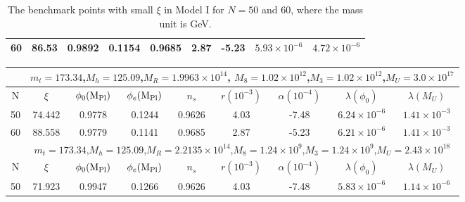 \documentclass[aps,prd,preprint,superscriptaddress,showpacs,ctexart]{revtex4-1}
\providecommand{\tabularnewline}{\\}
\begin{document}
\begin{table}[H]
\begin{tabular}{|c|c|c|c|c|c|c|c|c|}
		\hline
		{\footnotesize{}{}{}60}  & {\footnotesize{}{}{}86.53}  & {\footnotesize{}{}{}0.9892}  & {\footnotesize{}{}{}0.1154}  & {\footnotesize{}{}{}0.9685}  & {\footnotesize{}{}{}2.87}  & {\footnotesize{}{}{}-5.23}  & {\footnotesize{}{}{}$5.93\times10^{-6}$}  & {\footnotesize{}{}{}$4.72\times10^{-6}$ }\tabularnewline
		\hline
	\end{tabular}
	\caption{The benchmark points with small $\xi$ in Model I for $N=50$ and
		60, where the mass unit is  GeV.}
	\label{tab:small_xi_case1} 
\end{table}



\begin{table}[H]
{\raggedright{}}%
\begin{tabular}{|c|c|c|c|c|c|c|c|c|}
\hline
 & \multicolumn{8}{c|}{{\footnotesize{}{}{}$m_{t}=173.34$,$M_{h}=125.09$,$M_{R}=1.9963\times10^{14}$,
$M_{8}=1.02\times10^{12}$,$M_{3}=1.02\times10^{12}$,$M_{U}=3.0\times10^{17}$}}\tabularnewline
\hline
{\footnotesize{}{}{}N}  & {\footnotesize{}{}{}$\xi$ }  & {\footnotesize{}{}{}$\phi_{0}({\rm M_{Pl})}$}  & {\footnotesize{}{}{}$\phi_{e}({\rm M_{Pl})}$}  & {\footnotesize{}{}{}$n_{s}$}  & {\footnotesize{}{}{}$r(10^{-3})$}  & {\footnotesize{}{}{}$\alpha(10^{-4})$}  & {\footnotesize{}{}{}$\lambda(\phi_{0})$}  & {\footnotesize{}{}{}$\lambda(M_{U})$}\tabularnewline
\hline
{\footnotesize{}{}{}50}  & {\footnotesize{}{}{}74.442}  & {\footnotesize{}{}{}0.9778}  & {\footnotesize{}{}{}0.1244}  & {\footnotesize{}{}{}0.9626}  & {\footnotesize{}{}{}4.03}  & {\footnotesize{}{}{}-7.48}  & {\footnotesize{}{}{}$6.24\times10^{-6}$}  & {\footnotesize{}{}{}$1.41\times10^{-3}$}\tabularnewline
\hline
{\footnotesize{}{}{}60}  & {\footnotesize{}{}{}88.558}  & {\footnotesize{}{}{}0.9779}  & {\footnotesize{}{}{}0.1141}  & {\footnotesize{}{}{}0.9685}  & {\footnotesize{}{}{}2.87}  & {\footnotesize{}{}{}-5.23}  & {\footnotesize{}{}{}$6.21\times10^{-6}$}  & {\footnotesize{}{}{}$1.41\times10^{-3}$}\tabularnewline
\hline
 & \multicolumn{8}{c|}{{\footnotesize{}{}{}$m_{t}=173.34$,$M_{h}=125.09$,$M_{R}=2.2135\times10^{14}$,$M_{8}=1.24\times10^{9}$,$M_{3}=1.24\times10^{9}$,$M_{U}=2.43\times10^{18}$}}\tabularnewline
\hline
{\footnotesize{}{}{}N}  & {\footnotesize{}{}{}$\xi$ }  & {\footnotesize{}{}{}$\phi_{0}({\rm M_{Pl})}$}  & {\footnotesize{}{}{}$\phi_{e}({\rm M_{Pl})}$}  & {\footnotesize{}{}{}$n_{s}$}  & {\footnotesize{}{}{}$r(10^{-3})$}  & {\footnotesize{}{}{}$\alpha(10^{-4})$}  & {\footnotesize{}{}{}$\lambda(\phi_{0})$}  & {\footnotesize{}{}{}$\lambda(M_{U})$}\tabularnewline
\hline
{\footnotesize{}{}{}50}  & {\footnotesize{}{}{}71.923}  & {\footnotesize{}{}{}0.9947}  & {\footnotesize{}{}{}0.1266}  & {\footnotesize{}{}{}0.9626}  & {\footnotesize{}{}{}4.03}  & {\footnotesize{}{}{}-7.48}  & {\footnotesize{}{}{}$5.83\times10^{-6}$}  & {\footnotesize{}{}{}$1.14\times10^{-6}$}\tabularnewline

\end{tabular}
\end{table}
\end{document}
